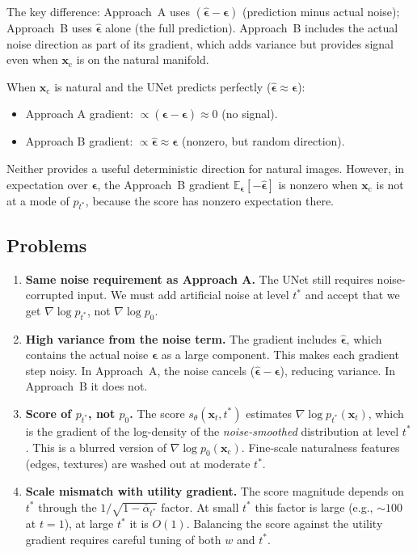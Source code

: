 \documentclass[11pt]{article}
\newcommand{\xb}{\mathbf{x}}
\newcommand{\xc}{\xb_{\mathrm{c}}}  %
\newcommand{\eb}{\boldsymbol{\epsilon}}
\newcommand{\E}{\mathbb{E}}
\newcommand{\alphabar}{\bar{\alpha}}
\begin{document}
The key difference: Approach~A uses $(\hat{\eb} - \eb)$ (prediction minus actual noise);
Approach~B uses $\hat{\eb}$ alone (the full prediction). Approach~B includes the actual
noise direction as part of its gradient, which adds variance but provides signal even
when $\xc$ is on the natural manifold.

When $\xc$ is natural and the UNet predicts perfectly ($\hat{\eb} \approx \eb$):
\begin{itemize}[nosep]
    \item Approach A gradient: $\propto (\hat{\eb} - \eb) \approx 0$ (no signal).
    \item Approach B gradient: $\propto \hat{\eb} \approx \eb$ (nonzero, but random direction).
\end{itemize}

Neither provides a useful deterministic direction for natural images. However, in expectation
over $\eb$, the Approach~B gradient $\E_\eb[-\hat{\eb}]$ is nonzero when $\xc$ is not at a mode
of $p_{t^*}$, because the score has nonzero expectation there.

\subsection{Problems}

\begin{enumerate}
    \item \textbf{Same noise requirement as Approach A.}
    The UNet still requires noise-corrupted input. We must add artificial noise
    at level $t^*$ and accept that we get $\nabla \log p_{t^*}$, not $\nabla \log p_0$.

    \item \textbf{High variance from the noise term.}
    The gradient includes $\hat{\eb}$, which contains the actual noise $\eb$ as a large
    component. This makes each gradient step noisy. In Approach~A, the noise cancels
    ($\hat{\eb} - \eb$), reducing variance. In Approach~B it does not.

    \item \textbf{Score of $p_{t^*}$, not $p_0$.}
    The score $s_\theta(\xb_t, t^*)$ estimates $\nabla \log p_{t^*}(\xb_t)$, which is
    the gradient of the log-density of the \emph{noise-smoothed} distribution at level $t^*$.
    This is a blurred version of $\nabla \log p_0(\xc)$. Fine-scale naturalness features
    (edges, textures) are washed out at moderate $t^*$.

    \item \textbf{Scale mismatch with utility gradient.}
    The score magnitude depends on $t^*$ through the $1/\sqrt{1-\alphabar_{t^*}}$ factor.
    At small $t^*$ this factor is large (e.g., $\sim 100$ at $t=1$), at large $t^*$
    it is $O(1)$. Balancing the score against the utility gradient requires careful
    tuning of both $w$ and $t^*$.
\end{enumerate}
\end{document}
